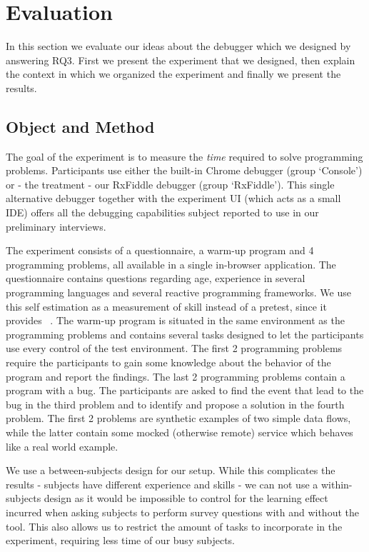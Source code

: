 \section{Evaluation}
\label{section-evaluation}

In this section we evaluate our ideas about the debugger which we designed by answering RQ3. First we present the experiment that we designed, then explain the context in which we organized the experiment and finally we present the results.

\subsection{Object and Method}
The goal of the experiment is to measure the \textit{time} required to solve programming problems. Participants use either the built-in Chrome debugger (group `Console') or - the treatment - our RxFiddle debugger (group `RxFiddle'). This single alternative debugger together with the experiment UI (which acts as a small IDE) offers all the debugging capabilities subject reported to use in our preliminary interviews.

The experiment consists of a questionnaire, a warm-up program and 4 programming problems, all available in a single in-browser application. The questionnaire contains questions regarding age, experience in several programming languages and several reactive programming frameworks. We use this self estimation as  a measurement of skill instead of a pretest, since it provides ~\cite{kleinschmager2011rate,feigenspan2012measuring,siegmund2014measuring}. The warm-up program is situated in the same environment as the programming problems and contains several tasks designed to let the participants use every control of the test environment. The first 2 programming problems require the participants to gain some knowledge about the behavior of the program and report the findings. The last 2 programming problems contain a program with a bug. The participants are asked to find the event that lead to the bug in the third problem and to identify and propose a solution in the fourth problem. The first 2 problems are synthetic examples of two simple data flows, while the latter contain some mocked (otherwise remote) service which behaves like a real world example.

We use a between-subjects design for our setup. While this complicates the results - subjects have different experience and skills - we can not use a within-subjects design as it would be impossible to control for the learning effect incurred when asking subjects to perform survey questions with and without the tool. This also allows us to restrict the amount of tasks to incorporate in the experiment, requiring less time of our busy subjects.

